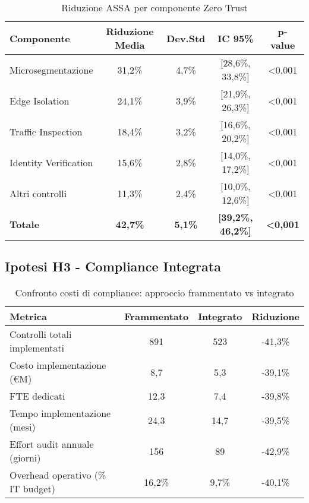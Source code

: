 \begin{table}[htbp]
\centering
\caption{Riduzione ASSA per componente Zero Trust}
\label{tab:assa_reduction_appendix}
\begin{tabular}{lcccc}
\toprule
\textbf{Componente} & \textbf{Riduzione Media} & \textbf{Dev.Std} & \textbf{IC 95\%} & \textbf{p-value} \\
\midrule
Microsegmentazione & 31,2\% & 4,7\% & [28,6\%, 33,8\%] & <0,001 \\
Edge Isolation & 24,1\% & 3,9\% & [21,9\%, 26,3\%] & <0,001 \\
Traffic Inspection & 18,4\% & 3,2\% & [16,6\%, 20,2\%] & <0,001 \\
Identity Verification & 15,6\% & 2,8\% & [14,0\%, 17,2\%] & <0,001 \\
Altri controlli & 11,3\% & 2,4\% & [10,0\%, 12,6\%] & <0,001 \\
\midrule
\textbf{Totale} & \textbf{42,7\%} & \textbf{5,1\%} & \textbf{[39,2\%, 46,2\%]} & \textbf{<0,001} \\
\bottomrule
\end{tabular}
\end{table}

\subsection{\texorpdfstring{Ipotesi H3 - Compliance Integrata}{B.2.3 - Ipotesi H3 - Compliance Integrata}}

\begin{table}[htbp]
\centering
\caption{Confronto costi di compliance: approccio frammentato vs integrato}
\label{tab:compliance_costs}
\begin{tabular}{lccc}
\toprule
\textbf{Metrica} & \textbf{Frammentato} & \textbf{Integrato} & \textbf{Riduzione} \\
\midrule
Controlli totali implementati & 891 & 523 & -41,3\% \\
Costo implementazione (€M) & 8,7 & 5,3 & -39,1\% \\
FTE dedicati & 12,3 & 7,4 & -39,8\% \\
Tempo implementazione (mesi) & 24,3 & 14,7 & -39,5\% \\
Effort audit annuale (giorni) & 156 & 89 & -42,9\% \\
Overhead operativo (\% IT budget) & 16,2\% & 9,7\% & -40,1\% \\
\bottomrule
\end{tabular}
\end{table}

